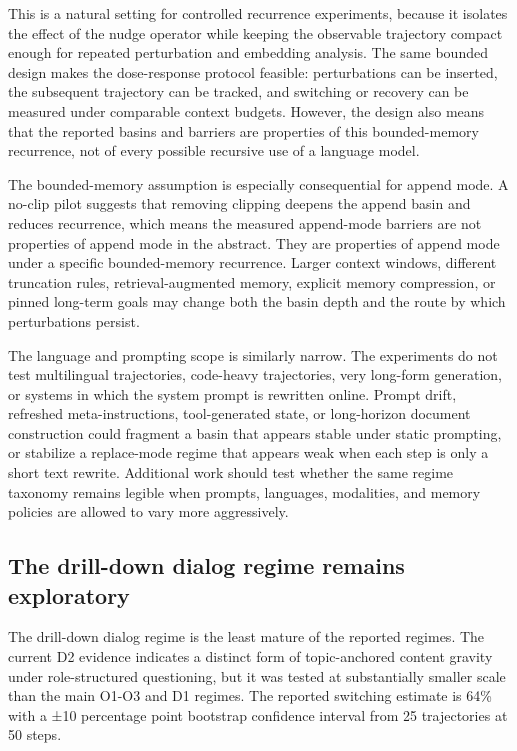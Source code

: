 \documentclass{article}
\theoremstyle{plain}
\theoremstyle{definition}
\begin{document}
This is a natural setting for controlled recurrence experiments, because it isolates the effect of the nudge operator while keeping the observable trajectory compact enough for repeated perturbation and embedding analysis. The same bounded design makes the dose-response protocol feasible: perturbations can be inserted, the subsequent trajectory can be tracked, and switching or recovery can be measured under comparable context budgets. However, the design also means that the reported basins and barriers are properties of this bounded-memory recurrence, not of every possible recursive use of a language model.

The bounded-memory assumption is especially consequential for append mode. A no-clip pilot suggests that removing clipping deepens the append basin and reduces recurrence, which means the measured append-mode barriers are not properties of append mode in the abstract. They are properties of append mode under a specific bounded-memory recurrence. Larger context windows, different truncation rules, retrieval-augmented memory, explicit memory compression, or pinned long-term goals may change both the basin depth and the route by which perturbations persist.

The language and prompting scope is similarly narrow. The experiments do not test multilingual trajectories, code-heavy trajectories, very long-form generation, or systems in which the system prompt is rewritten online. Prompt drift, refreshed meta-instructions, tool-generated state, or long-horizon document construction could fragment a basin that appears stable under static prompting, or stabilize a replace-mode regime that appears weak when each step is only a short text rewrite. Additional work should test whether the same regime taxonomy remains legible when prompts, languages, modalities, and memory policies are allowed to vary more aggressively.

\subsection{The drill-down dialog regime remains exploratory}

The drill-down dialog regime is the least mature of the reported regimes. The current D2 evidence indicates a distinct form of topic-anchored content gravity under role-structured questioning, but it was tested at substantially smaller scale than the main O1-O3 and D1 regimes. The reported switching estimate is 64\% with a ±10 percentage point bootstrap confidence interval from 25 trajectories at 50 steps.
\end{document}
